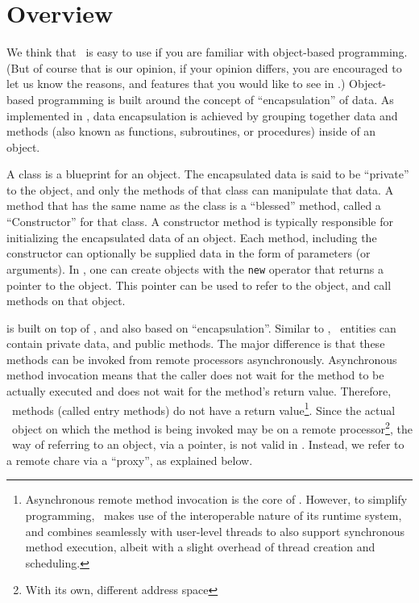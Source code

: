 \section{\charmpp{} Overview}

We think that \charmpp\ is easy to use if you are familiar with object-based
programming. (But of course that is our opinion, if your opinion differs,
you are encouraged to let us know the reasons, and features that you would
like to see in \charmpp.) Object-based programming is built around the
concept of ``encapsulation'' of data. As implemented in \CC, data
encapsulation is achieved by grouping together data and methods (also known
as functions, subroutines, or procedures) inside of an object.

A class is a blueprint for an object.  The encapsulated data is said to be
``private'' to the object, and only the methods of that class can manipulate
that data. A method that has the same name as the class is a ``blessed''
method, called a ``Constructor'' for that class.  A constructor method is
typically responsible for initializing the encapsulated data of an object.
Each method, including the constructor can optionally be supplied data in
the form of parameters (or arguments). In \CC, one can create objects with
the {\tt new} operator that returns a pointer to the object. This pointer
can be used to refer to the object, and call methods on that object.

\charmpp{} is built on top of \CC, and also based on ``encapsulation''.
Similar to \CC, \charmpp\ entities can contain private data, and public
methods. The major difference is that these methods can be invoked from
remote processors asynchronously.  Asynchronous method invocation means that
the caller does not wait for the method to be actually executed and does not
wait for the method's return value. Therefore, \charmpp\ methods (called
entry methods) do not have a return value\footnote{Asynchronous remote
method invocation is the core of \charmpp. However, to simplify programming,
\charmpp\ makes use of the interoperable nature of its runtime system, and
combines seamlessly with user-level threads to also support synchronous
method execution, albeit with a slight overhead of thread creation and
scheduling.}. Since the actual \charmpp\ object on which the method is being
invoked may be on a remote processor\footnote{With its own, different address
space}, the \CC\ way of referring to an object, via a pointer, is not valid
in \charmpp.  Instead, we refer to a remote chare via a ``proxy'',
as explained below.

